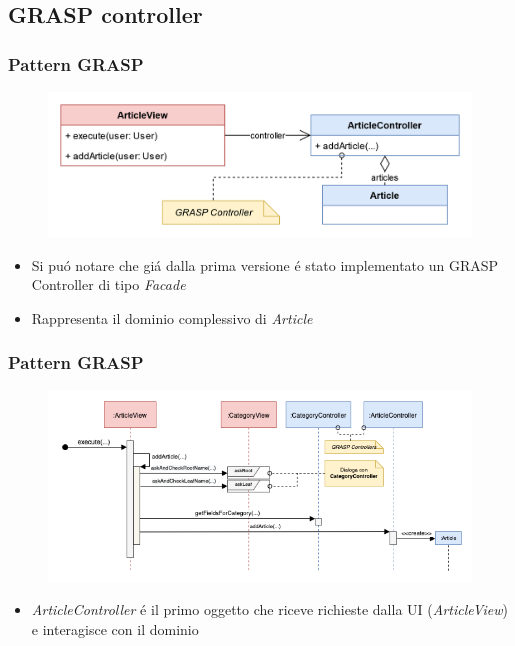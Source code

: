 \subsection{GRASP controller}
\beamertitle

\begin{frame}
    \frametitle{Pattern GRASP}
    \begin{figure}
        \includegraphics[width=1\textwidth]{img/MV.png}
    \end{figure}
    \begin{itemize}
        \item Si puó notare che giá dalla prima versione é stato implementato un GRASP Controller di tipo \emph{Facade}
        \item Rappresenta il dominio complessivo di \emph{Article}
    \end{itemize}
\end{frame}

\begin{frame}
    \frametitle{Pattern GRASP}
    \begin{figure}
        \includegraphics[width=1\textwidth]{img/sequenzaGraspController.png}
    \end{figure}
    \begin{itemize}
        \item \emph{ArticleController} é il primo oggetto che riceve richieste dalla UI (\emph{ArticleView}) e interagisce con il dominio
    \end{itemize}
\end{frame}




